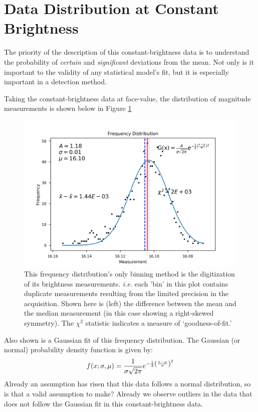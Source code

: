 \documentclass[12pt, a4paper]{article}
\begin{document}
\section{Data Distribution at Constant Brightness}
The priority of the description of this constant-brightness data is to understand the probability of \emph{certain} and \emph{significant} deviations from the mean.
Not only is it important to the validity of any statistical model's fit, but it is especially important in a detection method.

Taking the constant-brightness data at face-value, the distribution of magnitude measurements is shown below in Figure \ref{fig:freq_dist}

\begin{figure}[H]
\centering
\includegraphics[width=\textwidth]{freq_dist}
\caption{This frequency distribution's only binning method is the digitization of its brightness measurements.
  \emph{i.e.} each 'bin' in this plot contains duplicate measurements resulting from the limited precision in the acquisition.
  Shown here is (left) the difference between the mean and the median measurement (in this case showing a right-skewed symmetry).
  The $\chi ^2$ statistic indicates a measure of `goodness-of-fit.'
}
\label{fig:freq_dist}
\end{figure}

Also shown is a Gaussian fit of this frequency distribution.
The Gaussian (or normal) probability density function is given by:
\[
f(x; \sigma, \mu)
= \frac{1}{\sigma\sqrt{2\pi}}
e^{-\frac12\pqty{\frac{x-\mu}{\sigma}}^2}
\]
Already an assumption has risen that this data follows a normal distribution, so is that a valid assumption to make?
Already we observe outliers in the data that does not follow the Gaussian fit in this constant-brightness data.
\end{document}
